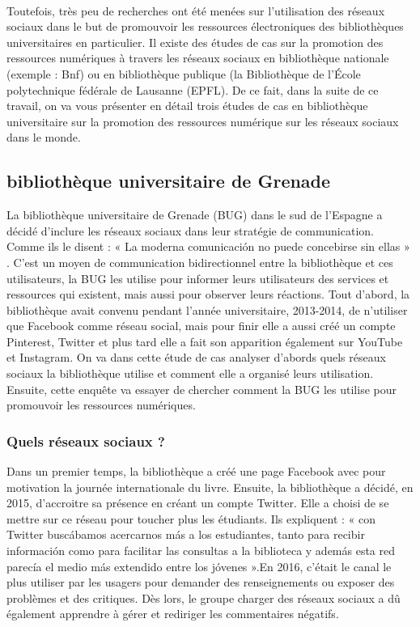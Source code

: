 \documentclass[a4paper,11pt]{article} %
\begin{document}
\\Toutefois, très peu de recherches ont été menées sur l’utilisation des réseaux sociaux dans le but de promouvoir les ressources électroniques des bibliothèques universitaires en particulier. Il existe des études de cas sur la promotion des ressources numériques à travers les réseaux sociaux en bibliothèque nationale (exemple : Bnf) ou en bibliothèque publique (la 
Bibliothèque de l’École polytechnique fédérale de Lausanne (EPFL)\citep{wagnieres2012etude,}. De ce fait, dans la suite de ce travail, on va vous présenter en détail trois études de cas en bibliothèque universitaire sur la promotion des ressources numérique sur les réseaux sociaux dans le monde.

\subsection{bibliothèque universitaire de Grenade} 
La bibliothèque universitaire de Grenade (BUG) dans le sud de l’Espagne a décidé d’inclure les réseaux sociaux dans leur stratégie de communication. Comme ils le disent : « La moderna comunicación no puede concebirse sin ellas
» \citep{fernandez2016redes,}. C’est un moyen de communication bidirectionnel entre la bibliothèque et ces utilisateurs, la BUG les utilise pour informer leurs utilisateurs des services et ressources qui existent, mais aussi pour observer leurs réactions. Tout d’abord, la bibliothèque avait convenu pendant l’année universitaire, 2013-2014, de n’utiliser que Facebook comme réseau social, mais pour finir elle a aussi créé un compte Pinterest, Twitter et plus tard elle a fait son apparition également sur YouTube et Instagram. On va dans cette étude de cas analyser d’abords quels réseaux sociaux la bibliothèque utilise et comment elle a organisé leurs utilisation. Ensuite, cette enquête va essayer de chercher
comment la BUG les utilise pour promouvoir les ressources numériques.

\subsubsection{ Quels réseaux sociaux ?}

Dans un premier temps, la bibliothèque a créé une page Facebook avec pour motivation 
la journée internationale du livre. Ensuite, la bibliothèque a décidé, en 2015, d’accroitre sa 
présence en créant un compte Twitter. Elle a choisi de se mettre sur ce réseau pour toucher plus 
les étudiants. Ils expliquent : « con Twitter buscábamos acercarnos más a los estudiantes, tanto 
para recibir información como para facilitar las consultas a la biblioteca y además esta red 
parecía el medio más extendido entre los jóvenes ».\citep{lagarde2019renvoi,}En 2016, c’était le canal le plus utiliser 
par les usagers pour demander des renseignements ou exposer des problèmes et des critiques.\citep{lagarde2019renvoi,} 
Dès lors, le groupe charger des réseaux sociaux a dû également apprendre à gérer et rediriger les commentaires négatifs.
\end{document}
